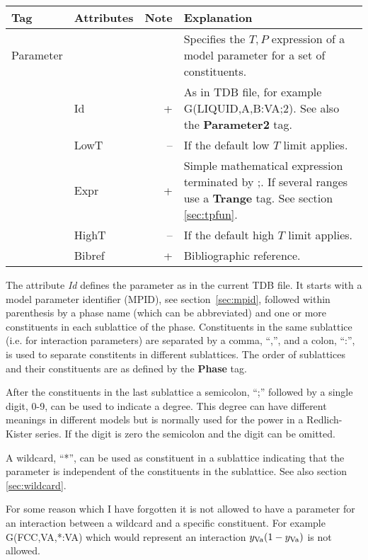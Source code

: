 \documentclass{article}
\begin{document}
\bigskip
\begin{tabular}{|p{} p{} r p{}|}\hline
  Tag & Attributes & Note & Explanation\\\hline

  Parameter & && Specifies the $T, P$ expression of a model parameter for a set of constituents.\\
      & Id & + & As in TDB file, for example G(LIQUID,A,B:VA;2).  See also the {\bf Parameter2} tag. \\
      & LowT & -- & If the default low $T$ limit applies.\\
      & Expr & + & Simple mathematical expression terminated by ;.  If several ranges use a {\bf Trange} tag.  See section \ref{sec:tpfun}.\\
      & HighT & -- & If the default high $T$ limit applies.\\
      & Bibref & + & Bibliographic reference.\\\hline
\end{tabular}

The attribute {\em Id} defines the parameter as in the current TDB
file.  It starts with a model parameter identifier (MPID), see
section~\ref{sec:mpid}, followed within parenthesis by a phase name
(which can be abbreviated) and one or more constituents in each
sublattice of the phase.  Constituents in the same sublattice (i.e.
for interaction parameters) are separated by a comma, ``,'', and a
colon, ``:'', is used to separate constitents in different
sublattices.  The order of sublattices and their constituents are as
defined by the {\bf Phase} tag.

After the constituents in the last sublattice a semicolon, ``;''
followed by a single digit, 0-9, can be used to indicate a degree.
This degree can have different meanings in different models but is
normally used for the power in a Redlich-Kister series.  If the digit
is zero the semicolon and the digit can be omitted.

A wildcard, ``*'', can be used as constituent in a sublattice
indicating that the parameter is independent of the constituents in
the sublattice.  See also section \ref{sec:wildcard}.

For some reason which I have forgotten it is not allowed to have a
parameter for an interaction between a wildcard and a specific
constituent.  For example G(FCC,VA,*:VA) which would represent an
interaction $y_{\rm Va}(1-y_{\rm Va})$ is not allowed.


\newpage 
\end{document}
